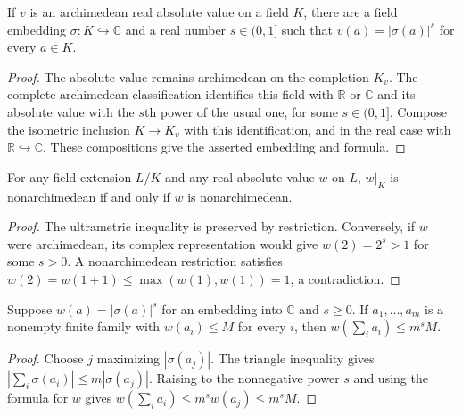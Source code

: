\begin{lemma}
\label{lem:archimedean-complex-embedding}
\leanok
{}
If $v$ is an archimedean real absolute value on a field $K$, there
are a field embedding $\sigma:K\hookrightarrow\mathbb C$ and a real
number $s\in(0,1]$ such that $v(a)=|\sigma(a)|^s$ for every $a\in K$.
\end{lemma}
\begin{proof}
The absolute value remains archimedean on the completion $K_v$.
The complete archimedean classification identifies this field with
$\mathbb R$ or $\mathbb C$ and its absolute value with the $s$th power
of the usual one, for some $s\in(0,1]$. Compose the isometric inclusion
$K\to K_v$ with this identification, and in the real case with
$\mathbb R\hookrightarrow\mathbb C$. These compositions give the
asserted embedding and formula.
\end{proof}

\begin{lemma}
\label{lem:nonarchimedean-restriction}
\leanok
{}
For any field extension $L/K$ and any real absolute value $w$ on $L$,
$w|_K$ is nonarchimedean if and only if $w$ is nonarchimedean.
\end{lemma}
\begin{proof}
The ultrametric inequality is preserved by restriction. Conversely,
if $w$ were archimedean, its complex representation would give
$w(2)=2^s>1$ for some $s>0$. A nonarchimedean restriction satisfies
$w(2)=w(1+1)\leq\max(w(1),w(1))=1$, a contradiction.
\end{proof}

\begin{lemma}
\label{lem:powered-complex-sum-bound}
\leanok
{}
Suppose $w(a)=|\sigma(a)|^s$ for an embedding into $\mathbb C$ and
$s\geq0$. If $a_1,\ldots,a_m$ is a nonempty finite family with
$w(a_i)\leq M$ for every $i$, then
$w(\sum_i a_i)\leq m^sM$.
\end{lemma}
\begin{proof}
Choose $j$ maximizing $|\sigma(a_j)|$. The triangle inequality gives
$|\sum_i\sigma(a_i)|\leq m|\sigma(a_j)|$. Raising to the nonnegative
power $s$ and using the formula for $w$ gives
$w(\sum_i a_i)\leq m^s w(a_j)\leq m^sM$.
\end{proof}

